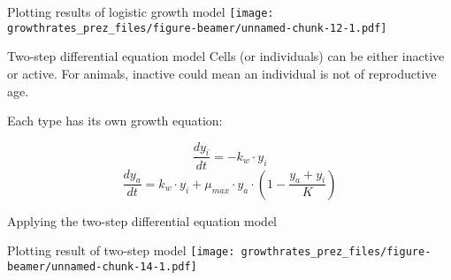 \documentclass[
  ignorenonframetext,
]{beamer}
\newenvironment{Shaded}{\begin{snugshade}}{\end{snugshade}}
\newcommand{\AttributeTok}[1]{\textcolor[rgb]{0.77,0.63,0.00}{#1}}
\newcommand{\FloatTok}[1]{\textcolor[rgb]{0.00,0.00,0.81}{#1}}
\newcommand{\FunctionTok}[1]{\textcolor[rgb]{0.00,0.00,0.00}{#1}}
\newcommand{\NormalTok}[1]{#1}
\newcommand{\OtherTok}[1]{\textcolor[rgb]{0.56,0.35,0.01}{#1}}
\newcommand{\SpecialCharTok}[1]{\textcolor[rgb]{0.00,0.00,0.00}{#1}}
\begin{document}
\begin{frame}{Plotting results of logistic growth model}
\protect\hypertarget{plotting-results-of-logistic-growth-model}{}
\texttt{[image: growthrates\_prez\_files/figure-beamer/unnamed-chunk-12-1.pdf]}
\end{frame}

\begin{frame}{Two-step differential equation model}
\protect\hypertarget{two-step-differential-equation-model}{}
Cells (or individuals) can be either inactive or active. For animals,
inactive could mean an individual is not of reproductive age.

Each type has its own growth equation:

\[\frac{dy_i}{dt} = - k_w \cdot y_i\]
\[\frac{dy_a}{dt} = k_w \cdot y_i + \mu_{max} \cdot y_a \cdot \left( 1 - \frac{y_a+y_i}{K} \right)\]
\end{frame}

\begin{frame}[fragile]{Applying the two-step differential equation
model}
\protect\hypertarget{applying-the-two-step-differential-equation-model}{}
\begin{Shaded}
\end{Shaded}
\end{frame}

\begin{frame}{Plotting result of two-step model}
\protect\hypertarget{plotting-result-of-two-step-model}{}
\texttt{[image: growthrates\_prez\_files/figure-beamer/unnamed-chunk-14-1.pdf]}
\end{frame}
\end{document}
